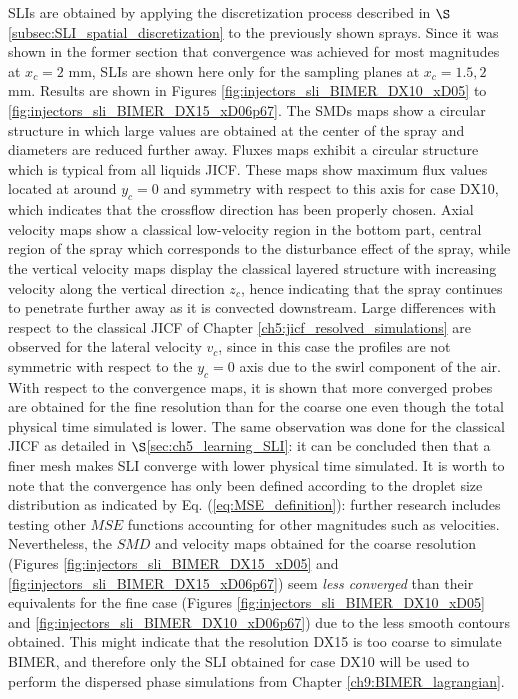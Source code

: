 


\newcommand\scaleSLIBIMER{0.175}

SLIs are obtained by applying the discretization process described in $\S$\ref{subsec:SLI_spatial_discretization} to the previously shown sprays. Since it was shown in the former section that convergence was achieved for most magnitudes at $x_c = 2$ mm, SLIs are shown here only for the sampling planes at $x_c = 1.5, 2$ mm. Results are shown in Figures \ref{fig:injectors_sli_BIMER_DX10_xD05} to  \ref{fig:injectors_sli_BIMER_DX15_xD06p67}. The SMDs maps show a circular structure in which large values are obtained at the center of the spray and diameters are reduced further away. Fluxes maps exhibit a circular structure which is typical from all liquids JICF. These maps show maximum flux values located at around $y_c = 0$ and symmetry with respect to this axis for case DX10, which indicates that the crossflow direction has been properly chosen. Axial velocity maps show a classical low-velocity region in the bottom part, central region of the spray which corresponds to the disturbance effect of the spray, while the vertical velocity maps display the classical layered structure with increasing velocity along the vertical direction $z_c$, hence indicating that the spray continues to penetrate further away as it is convected downstream. Large differences with respect to the classical JICF of Chapter \ref{ch5:jicf_resolved_simulations} are observed for the lateral velocity $v_c$, since in this case the profiles are not symmetric with respect to the $y_c = 0$ axis due to the swirl component of the air. With respect to the convergence maps, it is shown that more converged probes are obtained for the fine resolution than for the coarse one even though the total physical time simulated is lower. The same observation was done for the classical JICF as detailed in $\S$\ref{sec:ch5_learning_SLI}: it can be concluded then that a finer mesh makes SLI converge with lower physical time simulated. It is worth to note that the convergence has only been defined according to the droplet size distribution as indicated by Eq. (\ref{eq:MSE_definition}): further research includes testing other $MSE$ functions accounting for other magnitudes such as velocities. Nevertheless, the $SMD$ and velocity maps obtained for the coarse resolution (Figures \ref{fig:injectors_sli_BIMER_DX15_xD05} and \ref{fig:injectors_sli_BIMER_DX15_xD06p67}) seem \textsl{less converged} than their equivalents for the fine case (Figures \ref{fig:injectors_sli_BIMER_DX10_xD05} and \ref{fig:injectors_sli_BIMER_DX10_xD06p67}) due to the less smooth contours obtained. This might indicate that the resolution DX15 is too coarse to simulate BIMER, and therefore only the SLI obtained for case DX10 will be used to perform the dispersed phase simulations from Chapter \ref{ch9:BIMER_lagrangian}.


